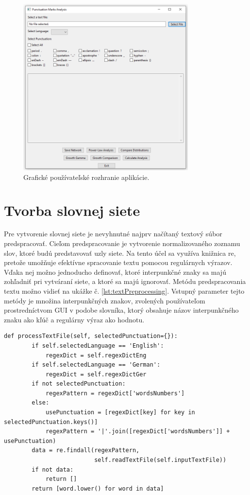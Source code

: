 \begin{figure}
    \centerline{\includegraphics[width=0.8\textwidth]{images/gui.png}}
    \caption[Grafické používateľské rozhranie aplikácie.]{Grafické používateľské rozhranie aplikácie.}
    \label{obr:gui}
\end{figure}
 

\section{Tvorba slovnej siete}\label{sec:creationOfWordNetwork}

Pre vytvorenie slovnej siete je nevyhnutné najprv načítaný textový súbor predspracovať. Cieľom predspracovanie je
vytvorenie normalizovaného zoznamu slov, ktoré budú predstavovať uzly siete. Na tento účel sa využíva knižnica re,
pretože umožňuje efektívne spracovanie textu pomocou regulárnych výrazov. Vďaka nej možno jednoducho definovať, ktoré
interpunkčné znaky sa majú zohľadniť pri vytváraní siete, a ktoré sa majú ignorovať. 
Metódu predspracovania textu možno vidieť na ukážke č. \ref{lst:textPreprocessing}. Vstupný parameter tejto metódy je
množina interpunkčných znakov, zvolených používateľom prostredníctvom GUI v podobe slovníka, ktorý obsahuje názov
interpunkčného znaku ako kľúč a regulárny výraz ako hodnotu.

\begin{lstlisting}[caption={Metóda predspracovania textu.}, label={lst:textPreprocessing}]
    def processTextFile(self, selectedPunctuation={}):
        if self.selectedLanguage == 'English':
            regexDict = self.regexDictEng
        if self.selectedLanguage == 'German':
            regexDict = self.regexDictGer
        if not selectedPunctuation:
            regexPattern = regexDict['wordsNumbers']
        else:
            usePunctuation = [regexDict[key] for key in selectedPunctuation.keys()]
            regexPattern = '|'.join([regexDict['wordsNumbers']] + usePunctuation)
        data = re.findall(regexPattern, 
                          self.readTextFile(self.inputTextFile))
        if not data:
            return []
        return [word.lower() for word in data]
\end{lstlisting}

